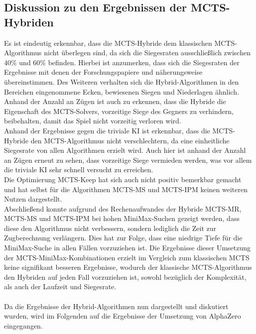 \documentclass[12pt,a4paper,bibliography=totocnumbered,listof=totocnumbered]{article}
\begin{document}
\subsection{Diskussion zu den Ergebnissen der MCTS-Hybriden}
Es ist eindeutig erkennbar, dass die MCTS-Hybride dem klassischen MCTS-Algorithmus nicht überlegen sind, da sich die Siegesraten ausschließlich zwischen $40\%$ und $60\%$ befinden. Hierbei ist anzumerken, dass sich die Siegesraten der Ergebnisse mit denen der Forschungspapiere \cite{Baier.2015} und \cite{Baier.2018} näherungsweise übereinstimmen. Des Weiteren verhalten sich die Hybrid-Algorithmen in den Bereichen eingenommene Ecken, bewiesenen Siegen und Niederlagen ähnlich. Anhand der Anzahl an Zügen ist auch zu erkennen, dass die Hybride die Eigenschaft des MCTS-Solvers, vorzeitige Siege des Gegners zu verhindern, beibehalten, damit das Spiel nicht vorzeitig verloren wird.\\
Anhand der Ergebnisse gegen die triviale KI ist erkennbar, dass die MCTS-Hybride den MCTS-Algorithmus nicht verschlechtern, da eine einheitliche Siegesrate von allen Algorithmen erzielt wird. Auch hier ist anhand der Anzahl an Zügen erneut zu sehen, dass vorzeitige Siege vermieden werden, was vor allem die triviale KI sehr schnell versucht zu erreichen.\\
Die Optimierung MCTS-Keep hat sich auch nicht positiv bemerkbar gemacht und hat selbst für die Algorithmen MCTS-MS und MCTS-IPM keinen weiteren Nutzen dargestellt.\\
Abschließend konnte aufgrund des Rechenaufwandes der Hybride MCTS-MR, MCTS-MS und MCTS-IPM bei hohen MiniMax-Suchen gezeigt werden, dass diese den Algorithmus nicht verbessern, sondern lediglich die Zeit zur Zugberechnung verlängern. Dies hat zur Folge, dass eine niedrige Tiefe für die MiniMax-Suche in allen Fällen vorzuziehen ist. Die Ergebnisse dieser Umsetzung der MCTS-MiniMax-Kombinationen erzielt im Vergleich zum klassischen MCTS keine signifikant besseren Ergebnisse, wodurch der klassische MCTS-Algorithmus den Hybriden auf jeden Fall vorzuziehen ist, sowohl bezüglich der Komplexität, als auch der Laufzeit und Siegesrate.\\\\
Da die Ergebnisse der Hybrid-Algorithmen nun dargestellt und diskutiert wurden, wird im Folgenden auf die Ergebnisse der Umsetzung von AlphaZero eingegangen.
\end{document}
